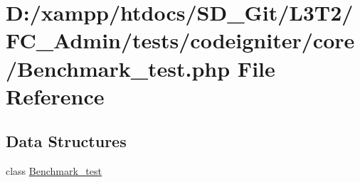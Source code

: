 \hypertarget{_benchmark__test_8php}{}\section{D\+:/xampp/htdocs/\+S\+D\+\_\+\+Git/\+L3\+T2/\+F\+C\+\_\+\+Admin/tests/codeigniter/core/\+Benchmark\+\_\+test.php File Reference}
\label{_benchmark__test_8php}
\subsection*{Data Structures}
\begin{DoxyCompactItemize}
\item 
class \hyperlink{class_benchmark__test}{Benchmark\+\_\+test}
\end{DoxyCompactItemize}
